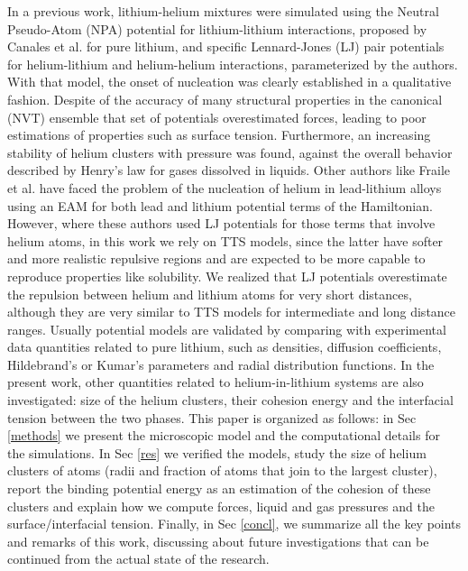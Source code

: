 \documentclass[jcp,amsmath,amssymb,preprint]{revtex4-1}
\begin{document}
In a previous work\cite{marti2022nucleation}, lithium-helium mixtures were simulated using the Neutral Pseudo-Atom (NPA) potential for lithium-lithium interactions, proposed by Canales et al.\cite{canales1994computer} for pure lithium, and specific Lennard-Jones (LJ) pair potentials for helium-lithium and helium-helium interactions,  parameterized by the authors.  With that model, the onset of nucleation was clearly established in a qualitative fashion.  Despite of the accuracy of many structural properties in the canonical (NVT) ensemble that set of potentials overestimated forces, leading to poor estimations of properties such as surface tension.  Furthermore,  an increasing stability of helium clusters with pressure was found, against the overall behavior described by Henry's law for gases dissolved in liquids.  Other authors like Fraile et al.\cite{fraile2020volume} have faced the problem of the nucleation of helium in lead-lithium alloys using an EAM for both lead and lithium potential terms of the Hamiltonian. However, where these authors used LJ potentials for those terms that involve helium atoms, in this work we rely on TTS models, since the latter have softer and more realistic repulsive regions and are expected to be more capable to reproduce properties like solubility\cite{sheng2021development}. We realized that LJ potentials overestimate the repulsion between helium and lithium atoms for very short distances, although they are very similar to TTS models for intermediate and long distance ranges. Usually potential models are validated by comparing with experimental data quantities related to pure lithium,  such as densities, diffusion coefficients, Hildebrand's or Kumar's parameters and radial distribution functions.  In the present work, other quantities related to helium-in-lithium systems are also investigated: size of the helium clusters, their cohesion energy and the interfacial tension between the two phases. This paper is organized as follows: in Sec \ref{methods} we present the microscopic model and the computational details for the simulations.  In Sec \ref{res} we verified the models, study the size of helium clusters of atoms (radii and fraction of atoms that join to the largest cluster),  report the binding potential energy\cite{marti2022nucleation} as an estimation of the cohesion of these clusters and explain how we compute forces, liquid and gas pressures and the surface/interfacial tension. Finally, in Sec \ref{concl}, we summarize all the key points and remarks of this work, discussing about future investigations that can be continued from the actual state of the research. 
    
\end{document}

